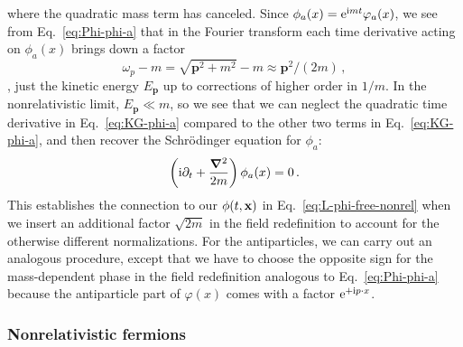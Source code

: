 %
where the quadratic mass term has canceled.  Since $\phi_a(x) = \mathrm{e}^{\mathrm{i} m t} 
\varphi_a(x)$, we see from Eq.~\eqref{eq:Phi-phi-a} that in the Fourier 
transform each time derivative acting on $\phi_a(x)$ brings down a factor
%
\begin{equation}
 \omega_p - m = \sqrt{{\mathbf{p}}^2 + m^2} - m \approx {\mathbf{p}}^2/(2m) \,,
\end{equation}
%
\ie, just the kinetic energy $E_{\mathbf{p}}$ up to corrections of higher order in 
$1/m$.  In the nonrelativistic limit, $E_{\mathbf{p}} \ll m$, so we see that we can 
neglect the quadratic time derivative in Eq.~\eqref{eq:KG-phi-a} compared to the 
other two terms in Eq.~\eqref{eq:KG-phi-a}, and then recover the Schr\"odinger 
equation for $\phi_a$:
%
\begin{equation}
 \left(\mathrm{i}\partial_t + \frac{\boldsymbol{\nabla}^2}{2m}\right)\phi_a(x) = 0 \,.
\end{equation}
%
This establishes the connection to our $\phi(t,\mathbf{x})$ in 
Eq.~\eqref{eq:L-phi-free-nonrel} when we insert an additional factor 
$\sqrt{2m}$ in the field redefinition to account for the otherwise different 
normalizations.  For the antiparticles, we can carry out an analogous procedure, 
except that we have to choose the opposite sign for the mass-dependent phase in 
the field redefinition analogous to Eq.~\eqref{eq:Phi-phi-a} because the 
antiparticle part of $\varphi(x)$ comes with a factor $\mathrm{e}^{+\mathrm{i} p\cdot x}$.

\subsubsection{Nonrelativistic fermions}
\label{sec:EFT-NonRelFerm}

